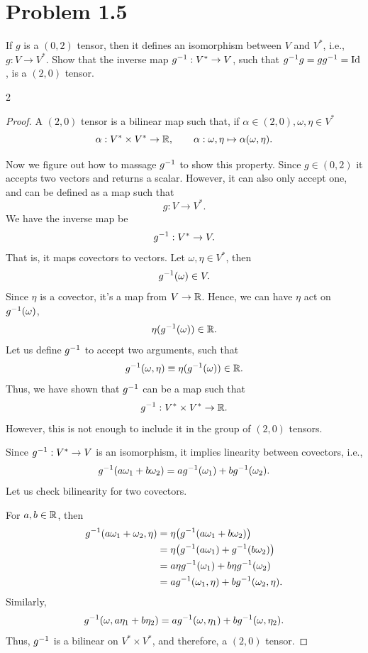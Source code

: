 \documentclass[12pt,a4paper]{article}
\begin{document}
	\section*{
		Problem 1.5
	}
	\begin{problem}
		If $g$ is a $(0,2)$ tensor, then it defines an isomorphism between $V$ and $V^*$,
		i.e., $g:V\to V^*$. Show that the inverse map $g^{-1}: V^* \to V$, such that 
		$g^{-1} g = gg^{-1} = \mathrm{Id}$, is a $(2,0)$ tensor.
	\end{problem}
	\begin{solution_pset}
		\begin{multicols*}{2}
			\begin{proof}
				A $(2,0)$ tensor is a bilinear map such that, if $\alpha\in(2,0), \omega,\eta\in V^*$
				\[
					\alpha:V^*\times V^*\to \mathbb{R},\qquad \alpha:\omega,\eta\mapsto \alpha(\omega,\eta).
				\]

				Now we figure out how to massage $g^{-1}$ to show this property.
				Since $g\in(0,2)$ it accepts two vectors and returns a scalar. 
				However, it can also only accept one,
				and can be defined as a map such that
				\[
					g: V \to V^*.
				\]
				We have the inverse map be 
				\[
					g^{-1}: V^* \to V.
				\]
				That is, it maps covectors to vectors. Let $\omega,\eta\in V^*$,
				then
				\[
					g^{-1}(\omega) \in V.
				\]
				Since $\eta$ is a covector, it's a map from $V\to \mathbb{R}$. Hence, we can
				have $\eta$ act on $g^{-1}(\omega)$,
				\[
					\eta(g^{-1}(\omega))\in\mathbb{R}.
				\]
				Let us define $g^{-1}$ to accept two arguments, such that
				\[
					g^{-1}(\omega,\eta)\equiv
					\eta(g^{-1}(\omega)) \in \mathbb{R}.
				\]
				Thus, we have shown that $g^{-1}$ can be a map such that
				\[
					g^{-1}:V^*\times V^* \to \mathbb{R}.
				\]
				However, this is not enough to include it in the group of $(2,0)$ tensors.

				Since $g^{-1}:V^* \to V$ is an isomorphism, it implies linearity between covectors, i.e.,
				\[
					g^{-1}(a \omega_1 + b \omega_2) = a g^{-1}(\omega_1)+ b g^{-1}(\omega_2).
				\]
				Let us check bilinearity for two covectors. 

				For $a,b\in\mathbb{R}$, then
				\begin{align*}
					g^{-1}(a\omega_1 + \omega_2, \eta)
					&=
					\eta\qty(g^{-1}(a\omega_1 + b\omega_2))\\
					&=
					\eta\qty(g^{-1}(a\omega_1) + g^{-1}(b\omega_2))\\
					&=
					a \eta g^{-1}(\omega_1) + b \eta g^{-1}(\omega_2)\\
					&=
					a g^{-1}(\omega_1,\eta) + b  g^{-1}(\omega_2,\eta).
				\end{align*}
				Similarly,
				\[
					g^{-1}(\omega,a\eta_1 + b\eta_2) = a g^{-1}(\omega,\eta_1) + b g^{-1}(\omega,\eta_2).
				\]
				Thus, $g^{-1}$ is a bilinear on $V^* \times V^*$, and therefore, a $(2,0)$ tensor.
			\end{proof}


\end{multicols*}
\end{solution_pset}
\end{document}
